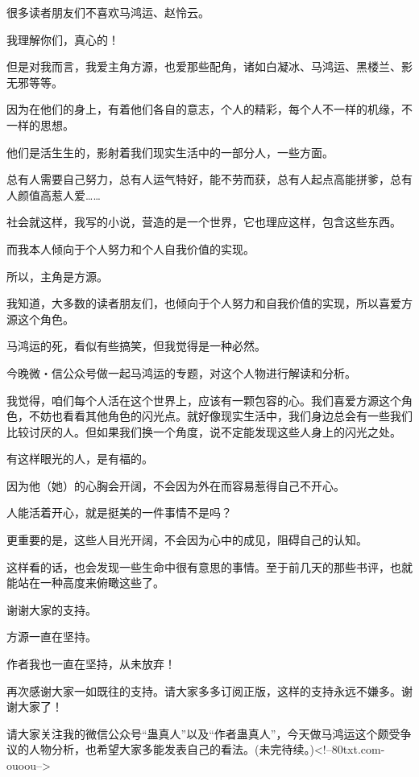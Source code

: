 \begin{this_body}
很多读者朋友们不喜欢马鸿运、赵怜云。

我理解你们，真心的！

但是对我而言，我爱主角方源，也爱那些配角，诸如白凝冰、马鸿运、黑楼兰、影无邪等等。

因为在他们的身上，有着他们各自的意志，个人的精彩，每个人不一样的机缘，不一样的思想。

他们是活生生的，影射着我们现实生活中的一部分人，一些方面。

总有人需要自己努力，总有人运气特好，能不劳而获，总有人起点高能拼爹，总有人颜值高惹人爱……

社会就这样，我写的小说，营造的是一个世界，它也理应这样，包含这些东西。

而我本人倾向于个人努力和个人自我价值的实现。

所以，主角是方源。

我知道，大多数的读者朋友们，也倾向于个人努力和自我价值的实现，所以喜爱方源这个角色。

马鸿运的死，看似有些搞笑，但我觉得是一种必然。

今晚微・信公众号做一起马鸿运的专题，对这个人物进行解读和分析。

我觉得，咱们每个人活在这个世界上，应该有一颗包容的心。我们喜爱方源这个角色，不妨也看看其他角色的闪光点。就好像现实生活中，我们身边总会有一些我们比较讨厌的人。但如果我们换一个角度，说不定能发现这些人身上的闪光之处。

有这样眼光的人，是有福的。

因为他（她）的心胸会开阔，不会因为外在而容易惹得自己不开心。

人能活着开心，就是挺美的一件事情不是吗？

更重要的是，这些人目光开阔，不会因为心中的成见，阻碍自己的认知。

这样看的话，也会发现一些生命中很有意思的事情。至于前几天的那些书评，也就能站在一种高度来俯瞰这些了。

谢谢大家的支持。

方源一直在坚持。

作者我也一直在坚持，从未放弃！

再次感谢大家一如既往的支持。请大家多多订阅正版，这样的支持永远不嫌多。谢谢大家了！

请大家关注我的微信公众号“蛊真人”以及“作者蛊真人”，今天做马鸿运这个颇受争议的人物分析，也希望大家多能发表自己的看法。(未完待续。)<!--80txt.com-ouoou-->

\end{this_body}


